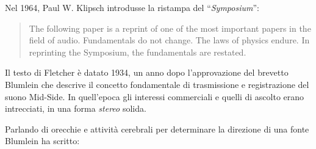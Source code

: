 Nel 1964, Paul W. Klipsch introdusse la ristampa del “\emph{Symposium}”:

\begin{quotation}
The following paper is a reprint of one of the most important papers in the
field of audio. Fundamentals do not change. The laws of physics endure. In
reprinting the Symposium, the fundamentals are restated. \cite{sap1964}
\end{quotation}

Il testo di Fletcher \cite{hf34} è datato 1934, un anno dopo l'approvazione
del brevetto Blumlein che descrive il concetto fondamentale di trasmissione e
registrazione del suono Mid-Side. In quell'epoca gli interessi commerciali e
quelli di ascolto erano intrecciati, in una forma \emph{stereo} solida.

Parlando di orecchie e attività cerebrali per determinare la direzione di una
fonte Blumlein ha scritto:

